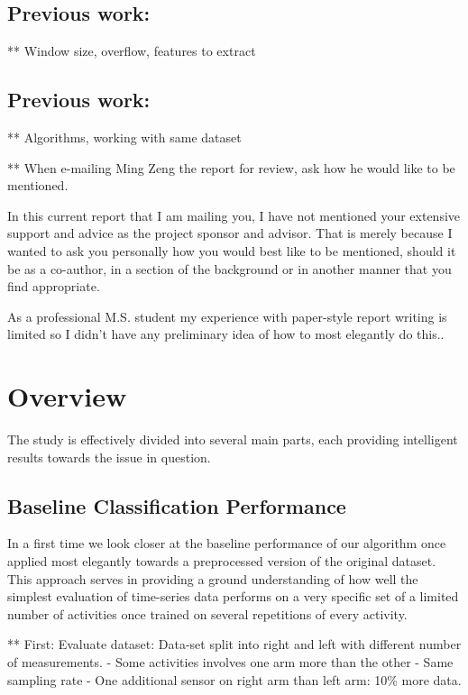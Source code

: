 \documentclass{sig-alternate}
\begin{document}
\subsection{Previous work: }

** Window size, overflow, features to extract

\subsection{Previous work: }

** Algorithms, working with same dataset



** When e-mailing Ming Zeng the report for review, ask how he would like to be mentioned.

In this current report that I am mailing you, I have not mentioned your extensive support and advice as the project sponsor and advisor. That is merely because I wanted to ask you personally how you would best like to be mentioned, should it be as a co-author, in a section of the background or in another manner that you find appropriate. 

As a professional M.S. student my experience with paper-style report writing is limited so I didn't have any preliminary idea of how to most elegantly do this..


\section{Overview}
The study is effectively divided into several main parts, each providing intelligent results towards the issue in question.

\subsection{Baseline Classification Performance}
In a first time we look closer at the baseline performance of our algorithm once applied most elegantly towards a preprocessed version of the original dataset. This approach serves in providing a ground understanding of how well the simplest evaluation of time-series data performs on a very specific set of a limited number of activities once trained on several repetitions of every activity.

** First: Evaluate dataset: Data-set split into right and left with different number of measurements.
- Some activities involves one arm more than the other
- Same sampling rate
- One additional sensor on right arm than left arm: 10\% more data.
\end{document}
